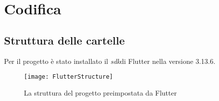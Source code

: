 

\section{Codifica} %

\subsection{Struttura delle cartelle}

Per il progetto è stato installato il \emph{\gls{sdk}}\glsfirstoccur\space di Flutter nella versione 3.13.6.\newline
\newline
\begin{figure}[!h] 
    \centering 
    \texttt{[image: FlutterStructure]} 
    \caption{La struttura del progetto preimpostata da Flutter}
    \label{fig:directory-flutter}
\end{figure}

